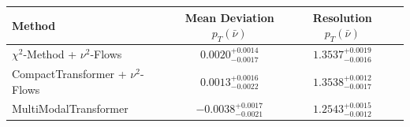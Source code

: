     \begin{tabular}{lccc}
        \toprule
        Method & Mean Deviation $p_{T}(\bar{\nu})$ & Resolution $p_{T}(\bar{\nu})$ \\
        \midrule
        $\chi^2$-Method + $\nu^2$-Flows & $0.0020^{+0.0014}_{-0.0017}$ & $1.3537^{+0.0019}_{-0.0016}$ \\
        CompactTransformer + $\nu^2$-Flows & $0.0013^{+0.0016}_{-0.0022}$ & $1.3538^{+0.0012}_{-0.0017}$ \\
        MultiModalTransformer & $-0.0038^{+0.0017}_{-0.0021}$ & $1.2543^{+0.0015}_{-0.0012}$ \\
        \bottomrule
    \end{tabular}